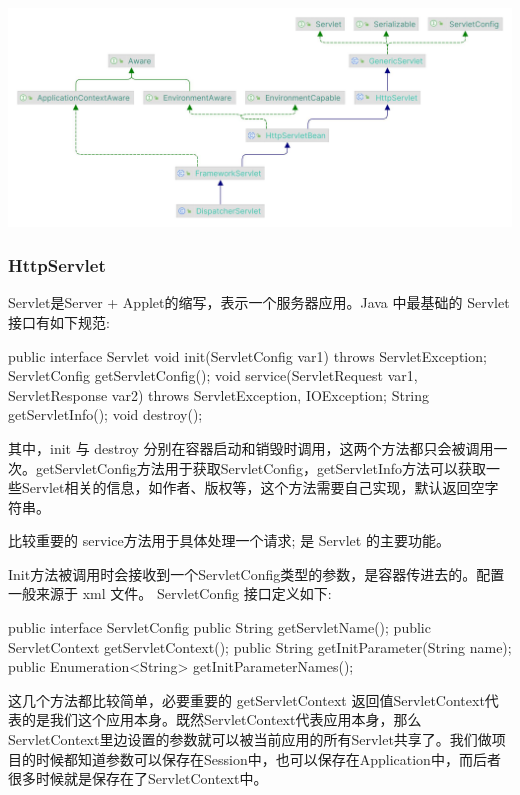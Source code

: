 \includegraphics[width=0.9\linewidth]{../../imgs/uml/DispatcherServlet.jpg}

\subsubsection{HttpServlet}

Servlet是Server + Applet的缩写，表示一个服务器应用。Java 中最基础的 Servlet 接口有如下规范:

\begin{Java}
public interface Servlet {
    void init(ServletConfig var1) throws ServletException;
    ServletConfig getServletConfig();
    void service(ServletRequest var1, ServletResponse var2) throws ServletException, IOException;
    String getServletInfo();
    void destroy();
}
\end{Java}

其中，init 与 destroy 分别在容器启动和销毁时调用，这两个方法都只会被调用一次。getServletConfig方法用于获取ServletConfig，getServletInfo方法可以获取一些Servlet相关的信息，如作者、版权等，这个方法需要自己实现，默认返回空字符串。

比较重要的 service方法用于具体处理一个请求; 是 Servlet 的主要功能。

Init方法被调用时会接收到一个ServletConfig类型的参数，是容器传进去的。配置一般来源于 xml 文件。 ServletConfig 接口定义如下:

\begin{Java}
public interface ServletConfig {
    public String getServletName();
    public ServletContext getServletContext();
    public String getInitParameter(String name);
    public Enumeration<String> getInitParameterNames();
}
\end{Java}

这几个方法都比较简单，必要重要的 getServletContext 返回值ServletContext代表的是我们这个应用本身。既然ServletContext代表应用本身，那么ServletContext里边设置的参数就可以被当前应用的所有Servlet共享了。我们做项目的时候都知道参数可以保存在Session中，也可以保存在Application中，而后者很多时候就是保存在了ServletContext中。

